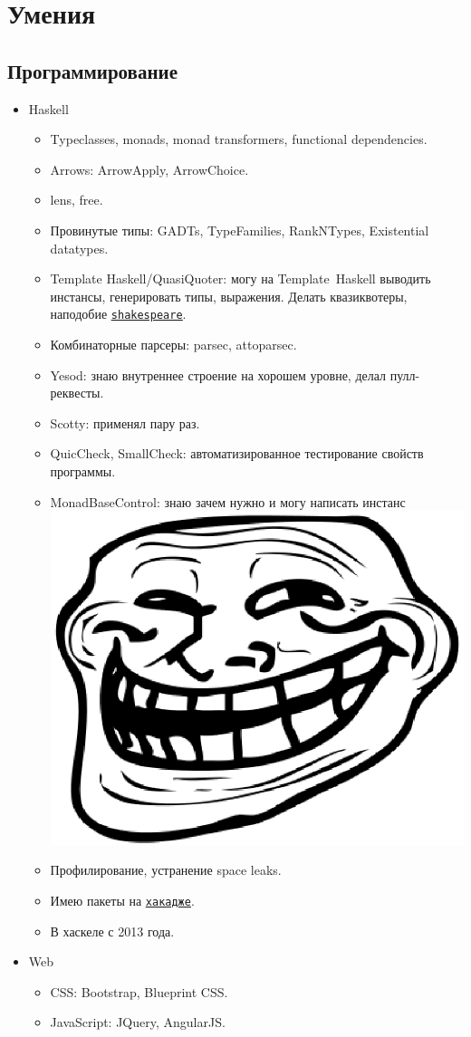 \documentclass[11pt,a4paper,sans]{moderncv}
\newcommand*{\nlink}[2]{\textcolor{blue}{\texttt{\underline{\href{#1}{#2}}}}}
\begin{document}
\section{Умения}

\subsection{Программирование}

\begin{itemize}
\item Haskell
  \begin{itemize}
  \item Typeclasses, monads, monad transformers, functional dependencies.
  \item Arrows: ArrowApply, ArrowChoice.
  \item lens, free.
  \item Провинутые типы: GADTs, TypeFamilies, RankNTypes, Existential datatypes.
  \item Template Haskell/QuasiQuoter: могу на \hbox{Template Haskell}
    выводить инстансы, генерировать типы, выражения. Делать
    квазиквотеры, наподобие
    \nlink{http://hackage.haskell.org/package/shakespeare}{shakespeare}.
  \item Комбинаторные парсеры: parsec, attoparsec.
  \item Yesod: знаю внутреннее строение на хорошем уровне, делал пулл-реквесты.
  \item Scotty: применял пару раз.
  \item QuicCheck, SmallCheck: автоматизированное тестирование свойств
    программы.
  \item MonadBaseControl: знаю зачем нужно и могу написать инстанс
    \includegraphics[height=0.9ex]{Trollface.ps}
  \item Профилирование, устранение space leaks.
  \item Имею пакеты на
    \nlink{http://hackage.haskell.org/user/AlekseyUymanov}{хакадже}.
  \item В хаскеле с 2013 года.
  \end{itemize}
\item Web
  \begin{itemize}
  \item CSS: Bootstrap, Blueprint CSS.
  \item JavaScript: JQuery, AngularJS.
  \end{itemize}

\end{itemize}
\end{document}
